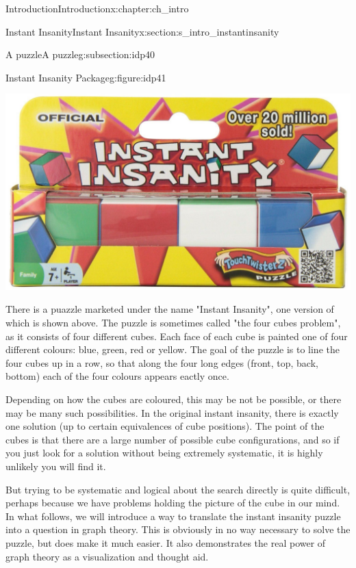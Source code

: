 \documentclass[oneside,10pt,]{book}
\numberwithin{equation}{section}
\begin{document}
\begin{chapterptx}{Introduction}{}{Introduction}{}{}{x:chapter:ch_intro}
\begin{sectionptx}{Instant Insanity}{}{Instant Insanity}{}{}{x:section:s_intro_instantinsanity}
\begin{introduction}{}
\end{introduction}%
%
%
\typeout{************************************************}
\typeout{************************************************}
%
\begin{subsectionptx}{A puzzle}{}{A puzzle}{}{}{g:subsection:idp40}
\begin{figureptx}{Instant Insanity Package}{g:figure:idp41}{}%
\begin{image}{0.1}{0.8}{0.1}%
\includegraphics[width=\linewidth]{images/InstantInsanityPackage.JPG}
\end{image}%
\tcblower
\end{figureptx}%
There is a puazzle marketed under the name "Instant Insanity", one version of which is shown above.  The puzzle is sometimes called "the four cubes problem", as it consists of four different cubes.   Each face of each cube is painted one of four different colours: blue, green, red or yellow. The goal of the puzzle is to line the four cubes up in a row, so that along the four long edges (front, top, back, bottom) each of the four colours appears eactly once.%
\par
Depending on how the cubes are coloured, this may be not be possible, or there may be many such possibilities. In the original instant insanity, there is exactly one solution (up to certain equivalences of cube positions).  The point of the cubes is that there are a large number of possible cube configurations, and so if you just look for a solution without being extremely systematic, it is highly unlikely you will find it.%
\par
But trying to be systematic and logical about the search directly is quite difficult, perhaps because we have problems holding the picture of the cube in our mind.  In what follows, we will introduce a way to translate the instant insanity puzzle into a question in graph theory.  This is obviously in no way necessary to solve the puzzle, but does make it much easier.  It also demonstrates the real power of graph theory as a visualization and thought aid.%

\end{subsectionptx}
\end{sectionptx}
\end{chapterptx}
\end{document}
